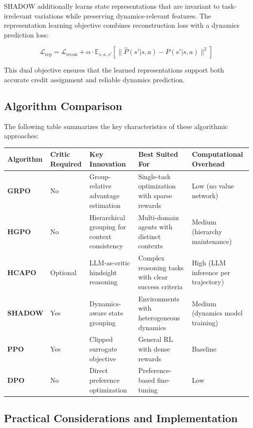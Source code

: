 SHADOW additionally learns state representations that are invariant to task-irrelevant variations while preserving dynamics-relevant features. The representation learning objective combines reconstruction loss with a dynamics prediction loss:

$$\mathcal{L}_{\text{rep}} = \mathcal{L}_{\text{recon}} + \alpha \cdot \mathbb{E}_{s,a,s'}\left[\|\hat{P}(s'|s,a) - P(s'|s,a)\|^2\right]$$

This dual objective ensures that the learned representations support both accurate credit assignment and reliable dynamics prediction.

\subsection{Algorithm Comparison}

The following table summarizes the key characteristics of these algorithmic approaches:

\begin{table}[tbp]
\centering
\footnotesize
\begin{tabularx}{\textwidth}{YYYYY}
\toprule
\textbf{Algorithm} & \textbf{Critic Required} & \textbf{Key Innovation} & \textbf{Best Suited For} & \textbf{Computational Overhead} \\
\midrule
\textbf{GRPO} & No & Group-relative advantage estimation & Single-task optimization with sparse rewards & Low (no value network) \\
\textbf{HGPO} & No & Hierarchical grouping for context consistency & Multi-domain agents with distinct contexts & Medium (hierarchy maintenance) \\
\textbf{HCAPO} & Optional & LLM-as-critic hindsight reasoning & Complex reasoning tasks with clear success criteria & High (LLM inference per trajectory) \\
\textbf{SHADOW} & Yes & Dynamics-aware state grouping & Environments with heterogeneous dynamics & Medium (dynamics model training) \\
\textbf{PPO} & Yes & Clipped surrogate objective & General RL with dense rewards & Baseline \\
\textbf{DPO} & No & Direct preference optimization & Preference-based fine-tuning & Low \\
\bottomrule
\end{tabularx}
\end{table}

\subsection{Practical Considerations and Implementation}

